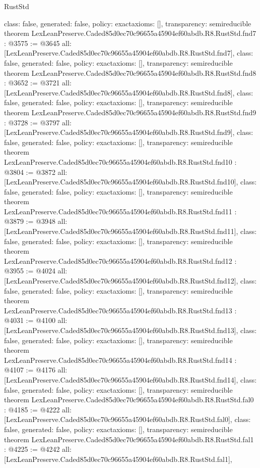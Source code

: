 \begin{lexlean}{RustStd}
\begin{coremodule}
{  class: false,
  generated: false,
  policy: exact{axioms: []},
  transparency: semireducible
}
theorem LexLeanPreserve.Caded85d0ec70c96655a45904ef60abdb.R8.RustStd.fnd7 : @3575 := @3645 {
  all: [LexLeanPreserve.Caded85d0ec70c96655a45904ef60abdb.R8.RustStd.fnd7],
  class: false,
  generated: false,
  policy: exact{axioms: []},
  transparency: semireducible
}
theorem LexLeanPreserve.Caded85d0ec70c96655a45904ef60abdb.R8.RustStd.fnd8 : @3652 := @3721 {
  all: [LexLeanPreserve.Caded85d0ec70c96655a45904ef60abdb.R8.RustStd.fnd8],
  class: false,
  generated: false,
  policy: exact{axioms: []},
  transparency: semireducible
}
theorem LexLeanPreserve.Caded85d0ec70c96655a45904ef60abdb.R8.RustStd.fnd9 : @3728 := @3797 {
  all: [LexLeanPreserve.Caded85d0ec70c96655a45904ef60abdb.R8.RustStd.fnd9],
  class: false,
  generated: false,
  policy: exact{axioms: []},
  transparency: semireducible
}
theorem LexLeanPreserve.Caded85d0ec70c96655a45904ef60abdb.R8.RustStd.fnd10 : @3804 := @3872 {
  all: [LexLeanPreserve.Caded85d0ec70c96655a45904ef60abdb.R8.RustStd.fnd10],
  class: false,
  generated: false,
  policy: exact{axioms: []},
  transparency: semireducible
}
theorem LexLeanPreserve.Caded85d0ec70c96655a45904ef60abdb.R8.RustStd.fnd11 : @3879 := @3948 {
  all: [LexLeanPreserve.Caded85d0ec70c96655a45904ef60abdb.R8.RustStd.fnd11],
  class: false,
  generated: false,
  policy: exact{axioms: []},
  transparency: semireducible
}
theorem LexLeanPreserve.Caded85d0ec70c96655a45904ef60abdb.R8.RustStd.fnd12 : @3955 := @4024 {
  all: [LexLeanPreserve.Caded85d0ec70c96655a45904ef60abdb.R8.RustStd.fnd12],
  class: false,
  generated: false,
  policy: exact{axioms: []},
  transparency: semireducible
}
theorem LexLeanPreserve.Caded85d0ec70c96655a45904ef60abdb.R8.RustStd.fnd13 : @4031 := @4100 {
  all: [LexLeanPreserve.Caded85d0ec70c96655a45904ef60abdb.R8.RustStd.fnd13],
  class: false,
  generated: false,
  policy: exact{axioms: []},
  transparency: semireducible
}
theorem LexLeanPreserve.Caded85d0ec70c96655a45904ef60abdb.R8.RustStd.fnd14 : @4107 := @4176 {
  all: [LexLeanPreserve.Caded85d0ec70c96655a45904ef60abdb.R8.RustStd.fnd14],
  class: false,
  generated: false,
  policy: exact{axioms: []},
  transparency: semireducible
}
theorem LexLeanPreserve.Caded85d0ec70c96655a45904ef60abdb.R8.RustStd.fal0 : @4185 := @4222 {
  all: [LexLeanPreserve.Caded85d0ec70c96655a45904ef60abdb.R8.RustStd.fal0],
  class: false,
  generated: false,
  policy: exact{axioms: []},
  transparency: semireducible
}
theorem LexLeanPreserve.Caded85d0ec70c96655a45904ef60abdb.R8.RustStd.fal1 : @4225 := @4242 {
  all: [LexLeanPreserve.Caded85d0ec70c96655a45904ef60abdb.R8.RustStd.fal1],
}
\end{coremodule}
\end{lexlean}
